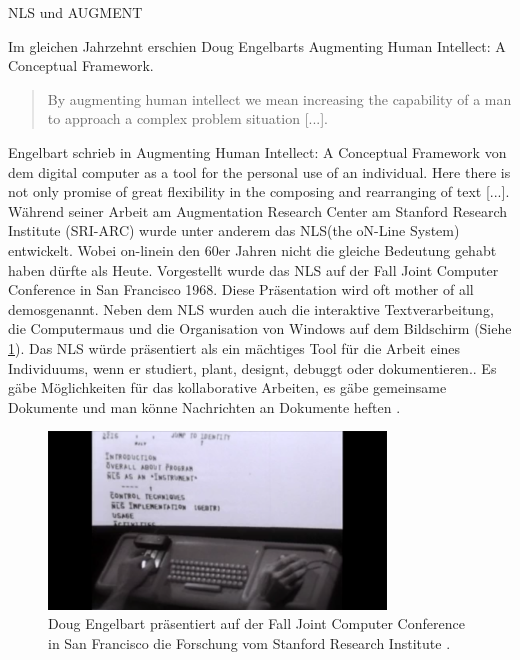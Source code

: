 \begin{section}{NLS und AUGMENT}
\label{sec:nls}

Im gleichen Jahrzehnt erschien Doug Engelbarts \glqq Augmenting Human Intellect: A Conceptual Framework\grqq{ }. 

\begin{quote}
\glqq By augmenting human intellect we mean increasing the capability of a man to approach a complex problem situation [...].\grqq{ }\cite[S. 1]{Engelbart1962}
\end{quote}

Engelbart schrieb in \glqq Augmenting Human Intellect: A Conceptual Framework\grqq{ } von dem \glqq digital computer as a tool for the personal use of an individual. Here there is not only promise of great flexibility in the composing and rearranging of text [...]\grqq{ }\cite[S. 17]{Engelbart1962}. Während seiner Arbeit am Augmentation Research Center am Stanford Research Institute (SRI-ARC) wurde unter anderem das \glqq NLS\grqq{ }(the oN-Line System) entwickelt. Wobei \glqq on-line\grqq{ }in den 60er Jahren nicht die gleiche Bedeutung gehabt haben dürfte als Heute. Vorgestellt wurde das NLS auf der Fall Joint Computer Conference in San Francisco 1968. Diese Präsentation wird oft \glqq mother of all demos\grqq{ }genannt. Neben dem NLS wurden auch die interaktive Textverarbeitung, die Computermaus und die Organisation von Windows auf dem Bildschirm (Siehe \ref{fig:mother}). Das NLS würde präsentiert als \glqq ein mächtiges Tool für die Arbeit eines Individuums, wenn er studiert, plant, designt, debuggt oder dokumentieren.\grqq{ }\cite{MotherOfDemo1968}. Es gäbe Möglichkeiten für das kollaborative Arbeiten, es gäbe gemeinsame Dokumente und man könne Nachrichten an Dokumente heften \cite{MotherOfDemo1968}. 

\begin{figure}[!ht]
	\centering
	\includegraphics[width=0.8\textwidth]{image/mother}
	\caption{Doug Engelbart präsentiert auf der Fall Joint Computer Conference in San Francisco die Forschung vom Stanford Research Institute \cite{MotherOfDemo1968}.}
	\label{fig:mother}
\end{figure}


\end{section}
